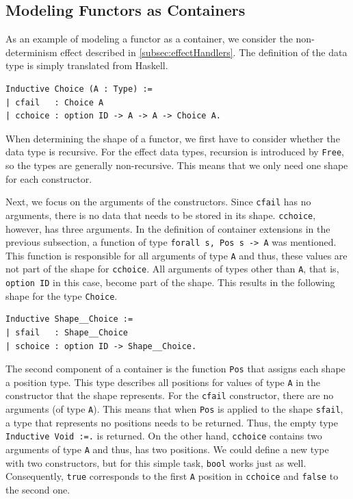 \documentclass[a4paper, 11pt, fleqn, twoside, abstract=on]{scrreprt}
\newcommand{\hinl}[1]{\texttt{#1}}
\newcommand{\cinl}[1]{\texttt{#1}}
\begin{document}
\subsection{Modeling Functors as Containers}
As an example of modeling a functor as a container, we consider the non-determinism effect described in \autoref{subsec:effectHandlers}.
The definition of the data type is simply translated from Haskell.

\begin{verbatim}
Inductive Choice (A : Type) :=
| cfail   : Choice A
| cchoice : option ID -> A -> A -> Choice A.
\end{verbatim}

When determining the shape of a functor, we first have to consider whether the data type is recursive.
For the effect data types, recursion is introduced by \cinl{Free}, so the types are generally non-recursive.
This means that we only need one shape for each constructor.

Next, we focus on the arguments of the constructors.
Since \cinl{cfail} has no arguments, there is no data that needs to be stored in its shape.
\cinl{cchoice}, however, has three arguments.
In the definition of container extensions in the previous subsection, a function of type \cinl{forall s, Pos s -> A} was mentioned.
This function is responsible for all arguments of type \cinl{A} and thus, these values are not part of the shape for \cinl{cchoice}.
All arguments of types other than \cinl{A}, that is, \cinl{option ID} in this case, become part of the shape.
This results in the following shape for the type \cinl{Choice}.

\begin{verbatim}
Inductive Shape__Choice :=
| sfail   : Shape__Choice
| schoice : option ID -> Shape__Choice.
\end{verbatim}

The second component of a container is the function \cinl{Pos} that assigns each shape a position type.
This type describes all positions for values of type \cinl{A} in the constructor that the shape represents.
For the \cinl{cfail} constructor, there are no arguments (of type \cinl{A}).
This means that when \cinl{Pos} is applied to the shape \cinl{sfail}, a type that represents no positions needs to be returned.
Thus, the empty type \cinl{Inductive Void :=.} is returned.
On the other hand, \hinl{cchoice} contains two arguments of type \cinl{A} and thus, has two positions.
We could define a new type with two constructors, but for this simple task, \cinl{bool} works just as well.
Consequently, \cinl{true} corresponds to the first \cinl{A} position in \cinl{cchoice} and \cinl{false} to the second one.
\end{document}
